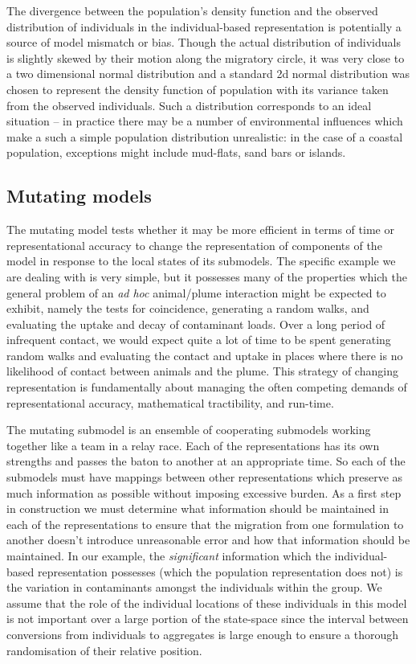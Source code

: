 \documentclass[preprint,authoryear,5p,twocolumn]{elsarticle}
\begin{document}
The divergence between the population's density function and the observed distribution of individuals in the
individual-based representation is potentially a source of model mismatch or bias. Though the actual distribution of
individuals is slightly skewed by their motion along the migratory circle, it was very close to a two dimensional
normal distribution and a standard 2d normal distribution was chosen to represent the density function of population
with its variance taken from the observed individuals. Such a distribution corresponds to an ideal situation -- in
practice there may be a number of environmental influences which make a such a simple population distribution
unrealistic: in the case of a coastal population, exceptions might include mud-flats, sand bars or islands.



\subsection{Mutating models}

The mutating model tests whether it may be more efficient in terms of time or representational accuracy to change the
representation of components of the model in response to the local states of its submodels. The specific example we are
dealing with is very simple, but it possesses many of the properties which the general problem of an {\em{ad hoc}}
animal/plume interaction might be expected to exhibit, namely the tests for coincidence, generating a random walks, and
evaluating the uptake and decay of contaminant loads. Over a long period of infrequent contact, we would expect quite a
lot of time to be spent generating random walks and evaluating the contact and uptake in places where there is no
likelihood of contact between animals and the plume. This strategy of changing representation is fundamentally about
managing the often competing demands of representational accuracy, mathematical tractibility, and run-time.

The mutating submodel is an ensemble of cooperating submodels working together like a team in a relay race. Each of the
representations has its own strengths and passes the baton to another at an appropriate time. So each of the submodels
must have mappings between other representations which preserve as much information as possible without imposing
excessive burden. As a first step in construction we must determine what information should be maintained in each of
the representations to ensure that the migration from one formulation to another doesn't introduce unreasonable error
and how that information should be maintained. In our example, the {\em{significant}} information which the
individual-based representation possesses (which the population representation does not) is the variation in
contaminants amongst the individuals within the group. We assume that the role of the individual locations of these
individuals in this model is not important over a large portion of the state-space since the interval between
conversions from individuals to aggregates is large enough to ensure a thorough randomisation of their relative
position.
\end{document}
